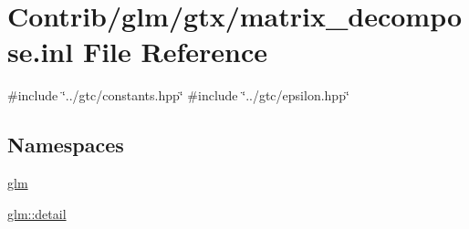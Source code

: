 \hypertarget{matrix__decompose_8inl}{}\section{Contrib/glm/gtx/matrix\+\_\+decompose.inl File Reference}
\label{matrix__decompose_8inl}
{\ttfamily \#include \char`\"{}../gtc/constants.\+hpp\char`\"{}}\newline
{\ttfamily \#include \char`\"{}../gtc/epsilon.\+hpp\char`\"{}}\newline
\subsection*{Namespaces}
\begin{DoxyCompactItemize}
\item 
 \mbox{\hyperlink{namespaceglm}{glm}}
\item 
 \mbox{\hyperlink{namespaceglm_1_1detail}{glm\+::detail}}
\end{DoxyCompactItemize}
